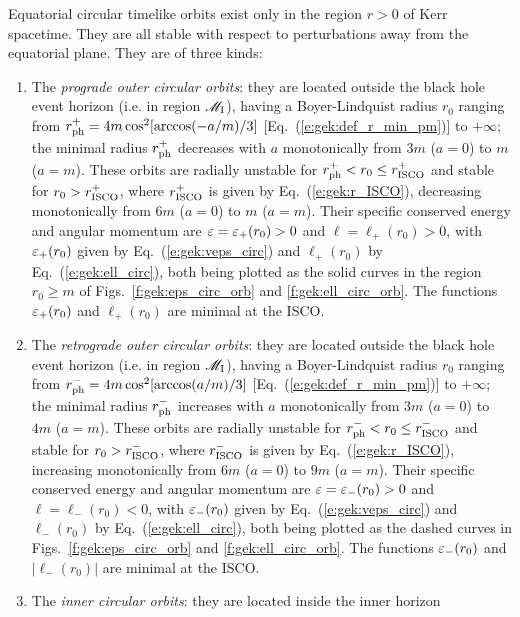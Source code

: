 \begin{prop}
Equatorial circular timelike orbits exist only in the region $r>0$ of Kerr spacetime.
They are all stable with respect to perturbations away from the equatorial plane.
They are of three kinds:
\begin{enumerate}
\item The \emph{prograde outer circular orbits}: they are located outside
the black hole event horizon (i.e. in region $\mathscr{M}_{\rm I}$), having a Boyer-Lindquist radius $r_0$ ranging
from  $r_{\rm ph}^+ = 4 m \cos^2[\arccos(-a/m)/3]$
[Eq.~(\ref{e:gek:def_r_min_pm})] to $+\infty$;
the minimal radius
$r_{\rm ph}^+$ decreases with $a$ monotonically from $3m$ ($a=0$) to $m$ ($a=m$).
These orbits are radially unstable for
$r_{\rm ph}^+ < r_0 \leq r_{\rm ISCO}^+$ and stable for $r_0 > r_{\rm ISCO}^+$,
where $r_{\rm ISCO}^+$ is given by Eq.~(\ref{e:gek:r_ISCO}),
decreasing monotonically from $6m$ ($a=0$) to $m$ ($a=m$).
Their specific conserved energy and angular momentum
are $\varepsilon = \varepsilon_+(r_0) >  0$ and $\ell = \ell_+(r_0) > 0$, with
$\varepsilon_+(r_0)$ given by Eq.~(\ref{e:gek:veps_circ}) and $\ell_+(r_0)$ by
Eq.~(\ref{e:gek:ell_circ}), both being plotted as the solid
curves in the region $r_0 \geq m$ of Figs.~\ref{f:gek:eps_circ_orb} and \ref{f:gek:ell_circ_orb}.
The functions $\varepsilon_+(r_0)$ and $\ell_+(r_0)$ are minimal at the ISCO.
\item The \emph{retrograde outer circular orbits}: they are located outside
the black hole event horizon (i.e. in region $\mathscr{M}_{\rm I}$), having a Boyer-Lindquist radius $r_0$ ranging
from $r_{\rm ph}^- = 4 m \cos^2[\arccos(a/m)/3]$
[Eq.~(\ref{e:gek:def_r_min_pm})] to $+\infty$; the minimal radius
$r_{\rm ph}^-$ increases with $a$ monotonically from $3m$ ($a=0$) to $4m$ ($a=m$).
These orbits are radially unstable for
$r_{\rm ph}^- < r_0 \leq r_{\rm ISCO}^-$ and stable for $r_0 > r_{\rm ISCO}^-$,
where $r_{\rm ISCO}^-$ is given by Eq.~(\ref{e:gek:r_ISCO}),
increasing monotonically from $6m$ ($a=0$) to $9m$ ($a=m$).
Their specific conserved energy and angular momentum
are $\varepsilon = \varepsilon_-(r_0) > 0$ and $\ell = \ell_-(r_0) < 0$, with
$\varepsilon_-(r_0)$ given by Eq.~(\ref{e:gek:veps_circ}) and $\ell_-(r_0)$ by
Eq.~(\ref{e:gek:ell_circ}), both being plotted as the dashed
curves in Figs.~\ref{f:gek:eps_circ_orb} and \ref{f:gek:ell_circ_orb}.
The functions $\varepsilon_-(r_0)$ and $|\ell_-(r_0)|$ are minimal at the ISCO.
\item The \emph{inner circular orbits}: they are located inside the inner horizon

\end{enumerate}
\end{prop}
